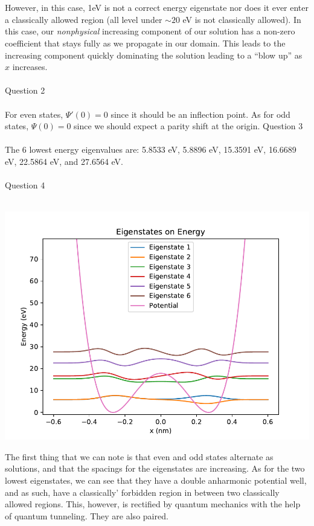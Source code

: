 \documentclass[10pt]{article} %
\begin{document}
\\ \\
\noindent \normalsize{However, in this case, 1eV is not a correct energy eigenstate nor does it ever enter a classically allowed region (all level under $\sim 20$ eV is not classically allowed). In this case, our \textit{nonphysical} increasing component of our solution has a non-zero coefficient that stays fully as we propagate in our domain. This leads to the increasing component quickly dominating the solution leading to a ``blow up'' as $x$ increases.}
\\ \\
\noindent \Large{Question 2}
\\ \\
\normalsize{For even states, $\Psi'(0)=0$ since it should be an inflection point. As for odd states, $\Psi(0)=0$ since we should expect a parity shift at the origin.}
\newpage
\noindent \Large{Question 3}
\\ \\
\normalsize{The 6 lowest energy eigenvalues are: 5.8533 eV, 5.8896 eV, 15.3591 eV, 16.6689 eV, 22.5864 eV, and 27.6564 eV.}
\\ \\
\noindent \Large{Question 4}
\\ \\
\begin{center}
\includegraphics[width=.8\textwidth]{../figs/q4_eigenstates.pdf}
\end{center}
\vspace{2em}
\noindent \normalsize{The first thing that we can note is that even and odd states alternate as solutions, and that the spacings for the eigenstates are increasing. As for the two lowest eigenstates, we can see that they have a double anharmonic potential well, and as such, have a classically' forbidden region in between two classically allowed regions. This, however, is rectified by quantum mechanics with the help of quantum tunneling. They are also paired.}
\end{document}
